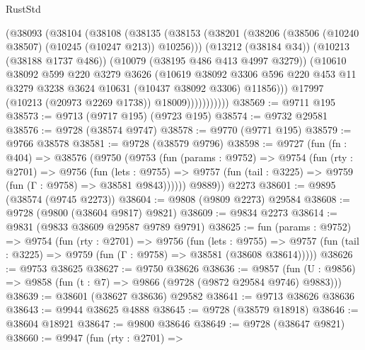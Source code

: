 \begin{lexlean}{RustStd}
\begin{coremodule}
                  (@38093
                    (@38104
                      (@38108
                        (@38135
                          (@38153
                            (@38201 (@38206 (@38506 (@10240 @38507) (@10245 (@10247 @213)) @10256)))
                            (@13212 (@38184 @34))
                            (@10213 (@38188 @1737 @486))
                            (@10079 (@38195 @486 @413 @4997 @3279))
                            (@10610
                              @38092
                              @599
                              @220
                              @3279
                              @3626
                              (@10619
                                @38092
                                @3306
                                @596
                                @220
                                @453
                                @11
                                @3279
                                @3238
                                @3624
                                @10631
                                (@10437 @38092 @3306)
                                @11856)))
                          @17997
                          (@10213 (@20973 @2269 @1738))
                          @18009)))))))))))
@38569 := @9711 @195
@38573 := @9713 (@9717 @195) (@9723 @195)
@38574 := @9732 @29581
@38576 := @9728 (@38574 @9747)
@38578 := @9770 (@9771 @195)
@38579 := @9766 @38578
@38581 := @9728 (@38579 @9796)
@38598 := @9727
    (fun (fn : @404) =>
    @38576
      (@9750
        (@9753
          (fun (params : @9752) =>
          @9754
            (fun (rty : @2701) =>
            @9756
              (fun (lets : @9755) =>
              @9757 (fun (tail : @3225) => @9759 (fun (Γ : @9758) => @38581 @9843))))))
        @9889))
    @2273
@38601 := @9895 (@38574 (@9745 @2273))
@38604 := @9808 (@9809 @2273) @29584
@38608 := @9728 (@9800 (@38604 @9817) @9821)
@38609 := @9834 @2273
@38614 := @9831 (@9833 @38609 @29587 @9789 @9791)
@38625 := fun (params : @9752) =>
  @9754
    (fun (rty : @2701) =>
    @9756
      (fun (lets : @9755) =>
      @9757 (fun (tail : @3225) => @9759 (fun (Γ : @9758) => @38581 (@38608 @38614)))))
@38626 := @9753 @38625
@38627 := @9750 @38626
@38636 := @9857
    (fun (U : @9856) => @9858 (fun (t : @7) => @9866 (@9728 (@9872 @29584 @9746) @9883)))
@38639 := @38601 (@38627 @38636) @29582
@38641 := @9713 @38626 @38636
@38643 := @9944 @38625 @4888
@38645 := @9728 (@38579 @18918)
@38646 := @38604 @18921
@38647 := @9800 @38646
@38649 := @9728 (@38647 @9821)
@38660 := @9947
    (fun (rty : @2701) =>

\end{coremodule}
\end{lexlean}
